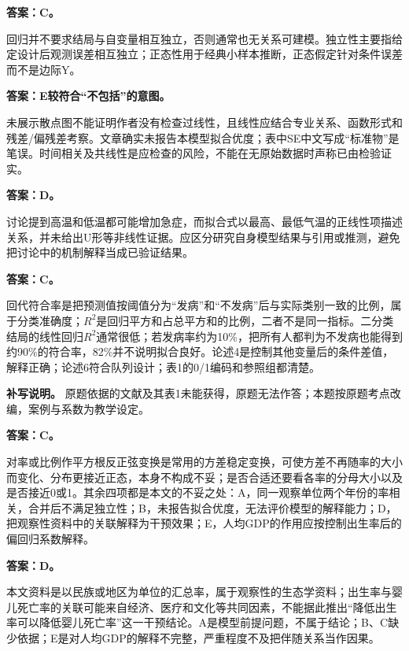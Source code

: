 
\textbf{答案：C。}

回归并不要求结局与自变量相互独立，否则通常也无关系可建模。独立性主要指给定设计后观测误差相互独立；正态性用于经典小样本推断，正态假定针对条件误差而不是边际Y。



\textbf{答案：E较符合``不包括''的意图。}

未展示散点图不能证明作者没有检查过线性，且线性应结合专业关系、函数形式和残差/偏残差考察。文章确实未报告本模型拟合优度；表中SE中文写成``标准物''是笔误。时间相关及共线性是应检查的风险，不能在无原始数据时声称已由检验证实。



\textbf{答案：D。}

讨论提到高温和低温都可能增加急症，而拟合式以最高、最低气温的正线性项描述关系，并未给出U形等非线性证据。应区分研究自身模型结果与引用或推测，避免把讨论中的机制解释当成已验证结果。



\textbf{答案：C。}

回代符合率是把预测值按阈值分为``发病''和``不发病''后与实际类别一致的比例，属于分类准确度；\(R^2\)是回归平方和占总平方和的比例，二者不是同一指标。二分类结局的线性回归\(R^2\)通常很低；若发病率约为10\%，把所有人都判为不发病也能得到约90\%的符合率，82\%并不说明拟合良好。论述4是控制其他变量后的条件差值，解释正确；论述6符合队列设计；表1的0/1编码和参照组都清楚。

\textbf{补写说明。} 原题依据的文献及其表1未能获得，原题无法作答；本题按原题考点改编，案例与系数为教学设定。



\textbf{答案：C。}

对率或比例作平方根反正弦变换是常用的方差稳定变换，可使方差不再随率的大小而变化、分布更接近正态，本身不构成不妥；是否合适还要看各率的分母大小以及是否接近0或1。其余四项都是本文的不妥之处：A，同一观察单位两个年份的率相关，合并后不满足独立性；B，未报告拟合优度，无法评价模型的解释能力；D，把观察性资料中的关联解释为干预效果；E，人均GDP的作用应按控制出生率后的偏回归系数解释。



\textbf{答案：D。}

本文资料是以民族或地区为单位的汇总率，属于观察性的生态学资料；出生率与婴儿死亡率的关联可能来自经济、医疗和文化等共同因素，不能据此推出``降低出生率可以降低婴儿死亡率''这一干预结论。A是模型前提问题，不属于结论；B、C缺少依据；E是对人均GDP的解释不完整，严重程度不及把伴随关系当作因果。


